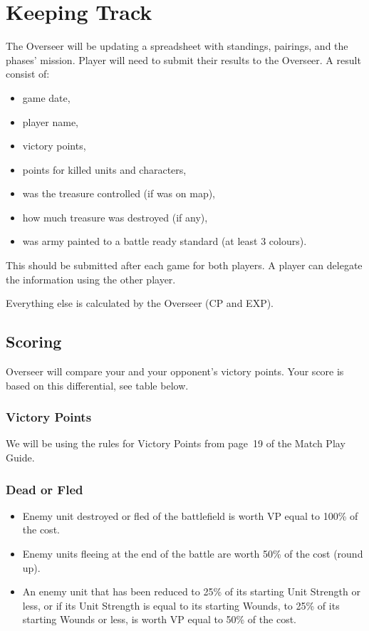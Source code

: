 \section{Keeping Track}

The Overseer will be updating a spreadsheet with standings, pairings, and the phases' mission.
Player will need to submit their results to the Overseer.
A result consist of: 
\begin{itemize}
  \item game date, 
  \item player name, 
  \item victory points, 
  \item points for killed units and characters,
  \item was the treasure controlled (if was on map),
  \item how much treasure was destroyed (if any),
  \item was army painted to a battle ready standard (at least 3 colours).
\end{itemize}
This should be submitted after each game for both players. A player can delegate the information using the other player.


Everything else is calculated by the Overseer (CP and EXP).

\subsection{Scoring}

Overseer will compare your and your opponent's victory points. Your score is based on this differential, see table below.

\subsubsection{Victory Points}

We will be using the rules for Victory Points from page~19 of the Match Play Guide.

\subsubsection{Dead or Fled}

\begin{itemize}
  \item Enemy unit destroyed or fled of the battlefield is worth VP equal to 100\% of the cost.
  \item Enemy units fleeing at the end of the battle are worth 50\% of the cost (round up).
  \item An enemy unit that has been reduced to 25\% of its starting Unit Strength or less, or if its Unit Strength is equal to its starting Wounds, to 25\% of its starting Wounds or less, is worth VP equal to 50\% of the cost.
\end{itemize}


